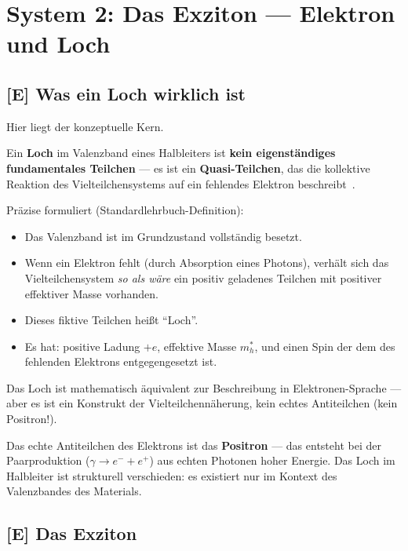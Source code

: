 \section{System 2: Das Exziton --- Elektron und Loch}
\label{sec:exziton}

\subsection{[E] Was ein Loch wirklich ist}

Hier liegt der konzeptuelle Kern.

\begin{important}
Ein \textbf{Loch} im Valenzband eines Halbleiters ist
\textbf{kein eigenständiges fundamentales Teilchen} ---
es ist ein \textbf{Quasi-Teilchen}, das die kollektive
Reaktion des Vielteilchensystems auf ein fehlendes Elektron
beschreibt~\cite{Kittel2004,AshcroftMermin1976}.

Präzise formuliert (Standardlehrbuch-Definition):
\begin{itemize}
  \item Das Valenzband ist im Grundzustand vollständig besetzt.
  \item Wenn ein Elektron fehlt (durch Absorption eines Photons),
    verhält sich das Vielteilchensystem \emph{so als wäre}
    ein positiv geladenes Teilchen mit positiver effektiver Masse
    vorhanden.
  \item Dieses fiktive Teilchen heißt ``Loch''.
  \item Es hat: positive Ladung $+e$, effektive Masse $m_h^*$,
    und einen Spin der dem des fehlenden Elektrons entgegengesetzt ist.
\end{itemize}

Das Loch ist mathematisch äquivalent zur Beschreibung
in Elektronen-Sprache --- aber es ist ein Konstrukt der
Vielteilchennäherung, kein echtes Antiteilchen
(kein Positron!).
\end{important}

Das echte Antiteilchen des Elektrons ist das \textbf{Positron} ---
das entsteht bei der Paarproduktion ($\gamma \to e^- + e^+$)
aus echten Photonen hoher Energie. Das Loch im Halbleiter
ist strukturell verschieden: es existiert nur im Kontext
des Valenzbandes des Materials.

\subsection{[E] Das Exziton}

